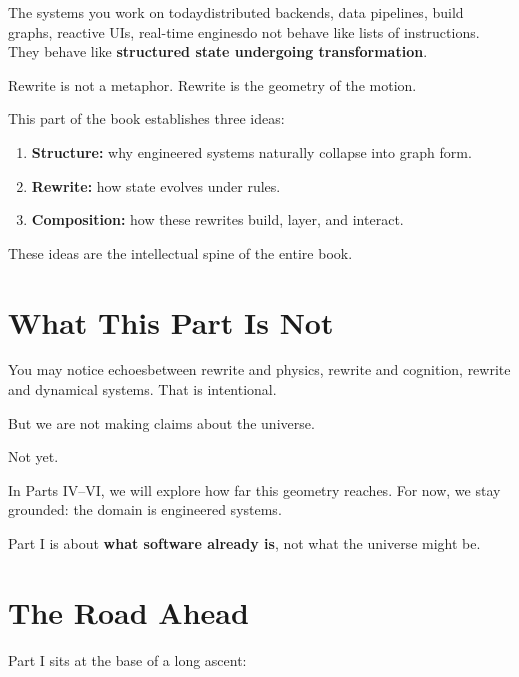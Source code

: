 The systems you work on today\emdash{}distributed backends,
data pipelines, build graphs, reactive UIs, real-time engines\emdash{}do not behave like lists of instructions.
They behave like \textbf{structured state undergoing transformation}.

Rewrite is not a metaphor.  
Rewrite is the geometry of the motion.

This part of the book establishes three ideas:

\begin{enumerate}
    \item \textbf{Structure:} why engineered systems naturally collapse into graph form.
    \item \textbf{Rewrite:} how state evolves under rules.
    \item \textbf{Composition:} how these rewrites build, layer, and interact.
\end{enumerate}

These ideas are the intellectual spine of the entire book.

\bigskip

\section*{What This Part Is Not}
\label{sec:not-yet}

You may notice echoes\emdash{}between rewrite and physics,
rewrite and cognition, rewrite and dynamical systems.
That is intentional.

But we are not making claims about the universe.

Not yet.

In Parts IV–VI, we will explore how far this geometry reaches.
For now, we stay grounded: the domain is engineered systems.

Part I is about \textbf{what software already is},  
not what the universe might be.

\bigskip

\section*{The Road Ahead}
\label{sec:road-ahead}

Part I sits at the base of a long ascent:

